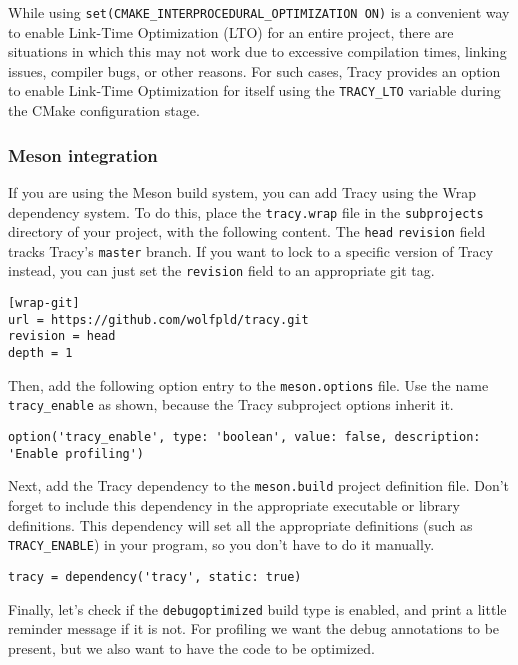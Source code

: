\documentclass[hidelinks,titlepage,a4paper,twoside]{article}
\begin{document}
While using \texttt{set(CMAKE\_INTERPROCEDURAL\_OPTIMIZATION ON)} is a convenient way to enable Link-Time Optimization (LTO) for an entire project, there are situations in which this may not work due to excessive compilation times, linking issues, compiler bugs, or other reasons.
For such cases, Tracy provides an option to enable Link-Time Optimization for itself using the \texttt{TRACY\_LTO} variable during the CMake configuration stage.

\subsubsection{Meson integration}

If you are using the Meson build system, you can add Tracy using the Wrap dependency system. To do this, place the \texttt{tracy.wrap} file in the \texttt{subprojects} directory of your project, with the following content. The \texttt{head} \texttt{revision} field tracks Tracy's \texttt{master} branch. If you want to lock to a specific version of Tracy instead, you can just set the \texttt{revision} field to an appropriate git tag.

\begin{lstlisting}
[wrap-git]
url = https://github.com/wolfpld/tracy.git
revision = head
depth = 1
\end{lstlisting}

Then, add the following option entry to the \texttt{meson.options} file. Use the name \texttt{tracy\_enable} as shown, because the Tracy subproject options inherit it.

\begin{lstlisting}
option('tracy_enable', type: 'boolean', value: false, description: 'Enable profiling')
\end{lstlisting}

Next, add the Tracy dependency to the \texttt{meson.build} project definition file. Don't forget to include this dependency in the appropriate executable or library definitions. This dependency will set all the appropriate definitions (such as \texttt{TRACY\_ENABLE}) in your program, so you don't have to do it manually.

\begin{lstlisting}
tracy = dependency('tracy', static: true)
\end{lstlisting}

Finally, let's check if the \texttt{debugoptimized} build type is enabled, and print a little reminder message if it is not. For profiling we want the debug annotations to be present, but we also want to have the code to be optimized.
\end{document}
